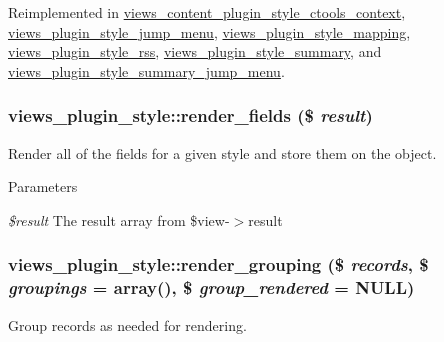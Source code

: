 Reimplemented in \hyperlink{classviews__content__plugin__style__ctools__context_a7b49db120c1bfa8e951e70bb24da42f1}{views\_\-content\_\-plugin\_\-style\_\-ctools\_\-context}, \hyperlink{classviews__plugin__style__jump__menu_aebc54d57acea582a05435beccaa26fef}{views\_\-plugin\_\-style\_\-jump\_\-menu}, \hyperlink{classviews__plugin__style__mapping_a0abe9d256844104b89045980cf991782}{views\_\-plugin\_\-style\_\-mapping}, \hyperlink{classviews__plugin__style__rss_aa6331538ac5b9cdc80478f98ba5e0de4}{views\_\-plugin\_\-style\_\-rss}, \hyperlink{classviews__plugin__style__summary_a240be31b796b50331a25cf30818e584f}{views\_\-plugin\_\-style\_\-summary}, and \hyperlink{classviews__plugin__style__summary__jump__menu_a7e9b8b44735067dc7ebb838e54a21a38}{views\_\-plugin\_\-style\_\-summary\_\-jump\_\-menu}.\hypertarget{classviews__plugin__style_a95d504017017c611b482a920119452db}{
\subsubsection[{render\_\-fields}]{\setlength{\rightskip}{0pt plus 5cm}views\_\-plugin\_\-style::render\_\-fields (\$ {\em result})}}
\label{classviews__plugin__style_a95d504017017c611b482a920119452db}
Render all of the fields for a given style and store them on the object.


\begin{DoxyParams}{Parameters}
\item[{\em \$result}]The result array from \$view-\/$>$result \end{DoxyParams}
\hypertarget{classviews__plugin__style_a8406e6f92ae056facd207acab0b34898}{
\subsubsection[{render\_\-grouping}]{\setlength{\rightskip}{0pt plus 5cm}views\_\-plugin\_\-style::render\_\-grouping (\$ {\em records}, \/  \$ {\em groupings} = {\ttfamily array()}, \/  \$ {\em group\_\-rendered} = {\ttfamily NULL})}}
\label{classviews__plugin__style_a8406e6f92ae056facd207acab0b34898}
Group records as needed for rendering.



